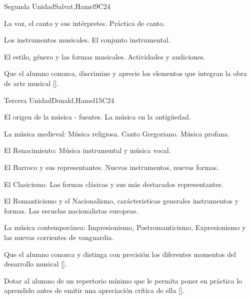 \begin{syllabus}
\begin{unit}{}{Segunda Unidad}{Salvat,Hamel}{9}{C24}
\begin{topics}
	\item La voz, el canto y sus intérpretes. Práctica de canto.
	\item Los instrumentos musicales. El conjunto instrumental.
	\item El estilo, género y las formas musicales. Actividades y audiciones.
\end{topics}
\begin{learningoutcomes}
	\item Que el alumno conozca, discrimine y aprecie los elementos que integran la obra de arte musical [\Usage].
\end{learningoutcomes}
\end{unit}

\begin{unit}{}{Tercera Unidad}{Donald,Hamel}{15}{C24}
\begin{topics}
	\item El origen de la música - fuentes. La música en la antigüedad.
	\item La música medieval: Música religiosa.  Canto Gregoriano. Música profana.
	\item El Renacimiento: Música instrumental y música vocal.
	\item El Barroco y sus representantes. Nuevos instrumentos, nuevas formas.
	\item El Clasicismo. Las formas clásicas y sus más destacados representantes.
	\item El Romanticismo y el Nacionalismo, carácteristicas generales instrumentos y formas. Las escuelas nacionalistas europeas.
	\item La música contemporánea: Impresionismo, Postromanticismo, Expresionismo y las nuevas corrientes de vanguardia.
\end{topics}
\begin{learningoutcomes}
	\item Que el alumno conozca y distinga con precisión los diferentes momentos del desarrollo musical [\Usage].
	\item Dotar al alumno de un repertorio mínimo que le permita poner en práctica lo aprendido antes de emitir una apreciación crítica de ella [\Usage].
\end{learningoutcomes}
\end{unit}


\end{syllabus}
